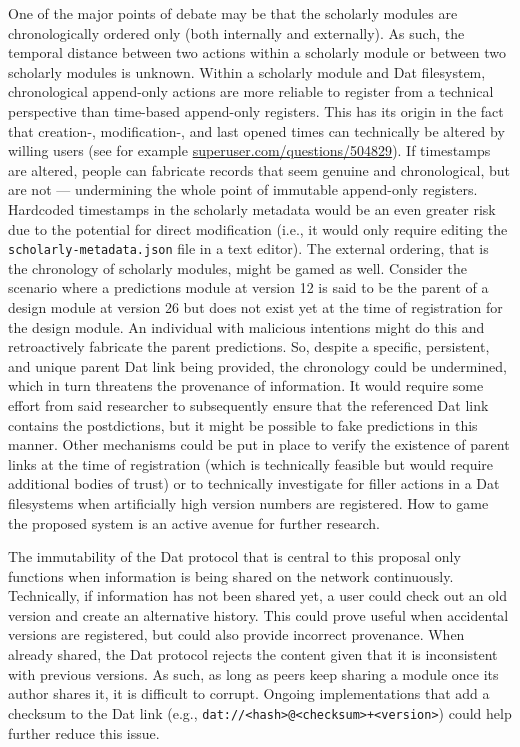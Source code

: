 \documentclass[publications,article,submit,moreauthors,pdftex,10pt,a4paper]{Definitions/mdpi}
\begin{document}
One of the major points of debate may be that the scholarly modules
are chronologically ordered only (both internally and externally). As
such, the temporal distance between two actions within a scholarly
module or between two scholarly modules is unknown. Within a scholarly
module and Dat filesystem, chronological append-only actions are more
reliable to register from a technical perspective than time-based
append-only registers. This has its origin in the fact that creation-,
modification-, and last opened times can technically be altered by
willing users (see for example
\href{https://superuser.com/questions/504829}{superuser.com/questions/504829}).
If timestamps are altered, people can fabricate records that seem
genuine and chronological, but are not --- undermining the whole point
of immutable append-only registers. Hardcoded timestamps in the
scholarly metadata would be an even greater risk due to the potential
for direct modification (i.e., it would only require editing the
\texttt{scholarly-metadata.json} file in a text editor). The external
ordering, that is the chronology of scholarly modules, might be gamed
as well. Consider the scenario where a predictions module at version
12 is said to be the parent of a design module at version 26 but does
not exist yet at the time of registration for the design module. An
individual with malicious intentions might do this and retroactively
fabricate the parent predictions. So, despite a specific, persistent,
and unique parent Dat link being provided, the chronology could be
undermined, which in turn threatens the provenance of information. It
would require some effort from said researcher to subsequently ensure
that the referenced Dat link contains the postdictions, but it might
be possible to fake predictions in this manner. Other mechanisms could
be put in place to verify the existence of parent links at the time of
registration (which is technically feasible but would require
additional bodies of trust) or to technically investigate for filler
actions in a Dat filesystems when artificially high version numbers
are registered. How to game the proposed system is an active avenue
for further research.

The immutability of the Dat protocol that is central to this proposal
only functions when information is being shared on the network
continuously. Technically, if information has not been shared yet, a
user could check out an old version and create an alternative
history. This could prove useful when accidental versions are
registered, but could also provide incorrect provenance. When already
shared, the Dat protocol rejects the content given that it is
inconsistent with previous versions. As such, as long as peers keep
sharing a module once its author shares it, it is difficult to
corrupt. Ongoing implementations that add a checksum to the Dat link
(e.g., \texttt{dat://<hash>@<checksum>+<version>}) could help further
reduce this issue.
\end{document}
